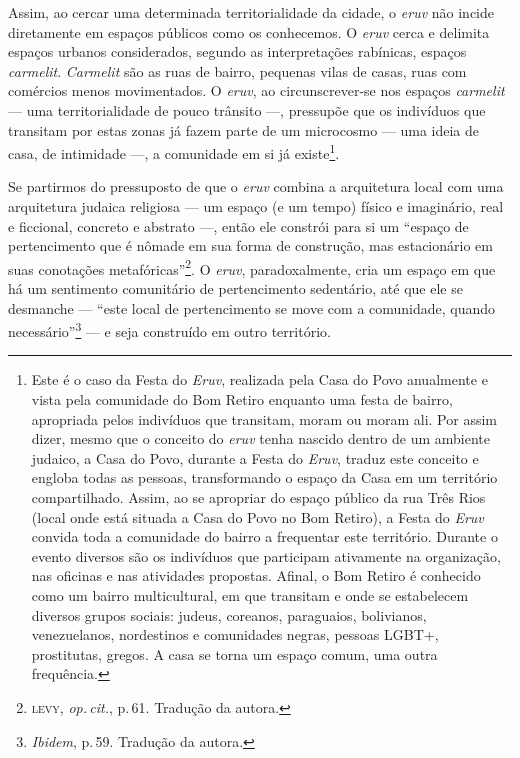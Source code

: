 Assim, ao cercar uma determinada territorialidade da cidade, o
\emph{eruv} não incide diretamente em espaços públicos como os
conhecemos. O \emph{eruv} cerca e delimita espaços urbanos considerados,
segundo as interpretações rabínicas, espaços \emph{carmelit}.
\emph{Carmelit} são as ruas de bairro, pequenas vilas de casas, ruas com
comércios menos movimentados. O \emph{eruv}, ao circunscrever-se nos
espaços \emph{carmelit} --- uma territorialidade de pouco trânsito ---,
pressupõe que os indivíduos que transitam por estas zonas já fazem parte
de um microcosmo --- uma ideia de casa, de intimidade ---, a comunidade
em si já existe\footnote{Este é o caso da Festa do \emph{Eruv},
  realizada pela Casa do Povo anualmente e vista pela comunidade do Bom
  Retiro enquanto uma festa de bairro, apropriada pelos indivíduos que
  transitam, moram ou moram ali. Por assim dizer, mesmo que o conceito
  do \emph{eruv} tenha nascido dentro de um ambiente judaico, a Casa do
  Povo, durante a Festa do \emph{Eruv}, traduz este conceito e engloba
  todas as pessoas, transformando o espaço da Casa em um território
  compartilhado. Assim, ao se apropriar do espaço público da rua Três
  Rios (local onde está situada a Casa do Povo no Bom Retiro), a Festa
  do \emph{Eruv} convida toda a comunidade do bairro a frequentar este
  território. Durante o evento diversos são os indivíduos que participam
  ativamente na organização, nas oficinas e nas atividades propostas.
  Afinal, o Bom Retiro é conhecido como um bairro multicultural, em que
  transitam e onde se estabelecem diversos grupos sociais: judeus,
  coreanos, paraguaios, bolivianos, venezuelanos, nordestinos e
  comunidades negras, pessoas LGBT+, prostitutas, gregos. A casa se
  torna um espaço comum, uma outra frequência.}.

Se partirmos do pressuposto de que o \emph{eruv} combina a arquitetura
local com uma arquitetura judaica religiosa --- um espaço (e um tempo)
físico e imaginário, real e ficcional, concreto e abstrato ---, então
ele constrói para si um ``espaço de pertencimento que é nômade em
sua forma de construção, mas estacionário em suas conotações
metafóricas''\footnote{\textsc{levy}, \emph{op.\,cit.}, p.\,61. Tradução da autora.}. O
\emph{eruv}, paradoxalmente, cria um espaço em que há um sentimento
comunitário de pertencimento sedentário, até que ele se desmanche ---
``este local de pertencimento se move com a comunidade, quando
necessário''\footnote{\emph{Ibidem}, p.\,59. Tradução da autora.} --- e seja
construído em outro território.

